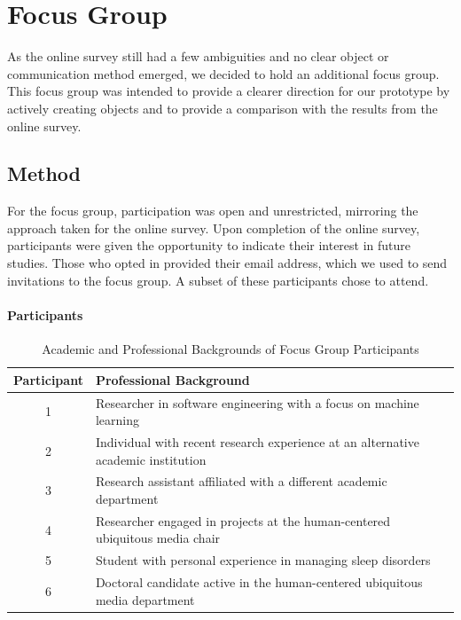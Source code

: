 \documentclass[
  a4paper,  %
  twoside,  %
  bibliography=totoc,
  headsepline,
  cleardoublepage=empty,
  parskip=half,
  draft=false
]{scrbook}
\begin{document}
\chapter{Focus Group}
As the online survey still had a few ambiguities and no clear object or communication method emerged, we decided to hold an additional focus group. This focus group was intended to provide a clearer direction for our prototype by actively creating objects and to provide a comparison with the results from the online survey.
\section{Method}
For the focus group, participation was open and unrestricted, mirroring the approach taken for the online survey. Upon completion of the online survey, participants were given the opportunity to indicate their interest in future studies. Those who opted in provided their email address, which we used to send invitations to the focus group. A subset of these participants chose to attend.
\subsubsection{Participants}

\begin{table}[h]
\centering
\begin{tabular}{|c|l|}
\hline
\textbf{Participant} & \textbf{Professional Background}                                          \\ \hline
1                    & Researcher in software engineering with a focus on machine learning       \\ \hline
2                    & Individual with recent research experience at an alternative academic institution \\ \hline
3                    & Research assistant affiliated with a different academic department        \\ \hline
4                    & Researcher engaged in projects at the human-centered ubiquitous media chair \\ \hline
5                    & Student with personal experience in managing sleep disorders              \\ \hline
6                    & Doctoral candidate active in the human-centered ubiquitous media department \\ \hline
\end{tabular}
\caption{Academic and Professional Backgrounds of Focus Group Participants}
\label{tab:participants_background}
\end{table}
\end{document}
